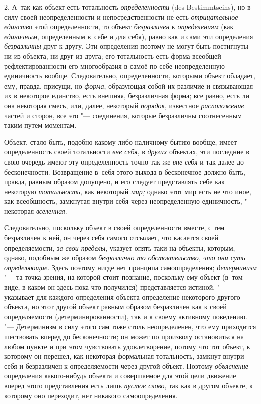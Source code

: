 2. А~так как объект есть тотальность {\em определенности} (des
Bestim\-mtseins), но в силу своей неопределенности и
непосредственности не есть {\em отрицательное единство}
этой определенности, то объект {\em безразличен} к
{\em определениям} (как {\em единичным},
определенным в~себе и для себя), равно как и сами эти
определения {\em безразличны}
друг к другу. Эти определения поэтому не могут быть
постигнуты ни из объекта, ни друг из друга; его тотальность есть форма
всеобщей рефлектированности его многообразия в самоё по себе неопределенную
единичность вообще. Следовательно, определенности, которыми объект
обладает, ему, правда, присущи, но {\em форма}, образующая
собой их различие и связывающая их в некоторое единство, есть внешняя,
безразличная форма; все равно, есть ли она некоторая смесь, или, далее,
некоторый {\em порядок}, известное
{\em расположение} частей
и сторон, все это "--- соединения, которые безразличны
соотнесенным таким путем моментам.

Объект, стало быть, подобно какому-либо наличному бытию
вообще, имеет определенность своей тотальности
{\em вне себя}, в {\em других} объектах,
эти последние в свою очередь имеют эту определенность точно так же
{\em вне себя} и так
далее до бесконечности. Возвращение в~себя этого выхода в бесконечное
должно быть, правда, равным образом допущено, и его следует представлять
себе как некоторую {\em тотальность}, как некоторый {\em мир;}
однако этот мир есть не что иное, как всеобщность, замкнутая
внутри себя через неопределенную единичность, "--- некоторая {\em вселенная}.

Следовательно, поскольку объект в своей определенности вместе,
с тем безразличен к ней, он через себя самого отсылает, что касается своей
определяемости, {\em за свои пределы},
указует опять-таки на объекты, которым, однако, подобным же
образом {\em безразлично то
обстоятельство, что они суть определяющие}. Здесь поэтому
нигде нет принципа самоопределения;
{\em детерминизм} "--- та
точка зрения, на которой стоит познание, поскольку ему объект (в~том виде,
в каком он здесь пока что получился) представляется истиной, "---
указывает для каждого определения объекта определение
некоторого другого объекта, но этот другой объект равным образом
безразличен как к своей определяемости (детерминированности), так и к
своему активному поведению. "--- Детерминизм в силу этого сам
тоже столь неопределенен, что ему приходится шествовать вперед до
бесконечности; он может по произволу остановиться на любом пункте и при
этом чувствовать удовлетворение, потому что тот объект, к которому он
перешел, как некоторая формальная тотальность, замкнут внутри себя и
безразличен к определяемости через другой объект. Поэтому {\em объяснение}
определения какого-нибудь объекта и совершаемое для этой цели
движение вперед этого представления есть лишь {\em пустое слово}, так
как в другом объекте, к которому оно переходит, нет никакого самоопределения.

